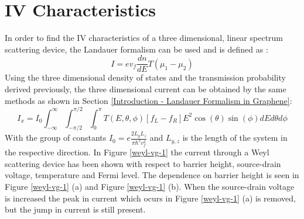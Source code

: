 		\section{IV Characteristics}
		\label{weyl - IV Characteristics}
		In order to find the IV characteristics of a three dimensional, linear spectrum scattering device, the Landauer formalism can be used and is defined as \cite{b6}:
		\begin{equation}
			I=ev_{f}\frac{dn}{dE}T\left(\mu_{1}-\mu_{2}\right)
		\end{equation}
		Using the three dimensional density of states and the transmission probability derived previously, the three dimensional current can be obtained by the same methods as shown in Section \ref{Introduction - Landauer Formalism in Graphene}:
		\begin{equation}
			I_{x}=I_{0}\int^{\infty}_{-\infty}\int^{\pi/2}_{-\pi/2}\int^{\pi}_{0}T\left(E,\theta, \phi\right)\left[f_{L}-f_{R}\right]E^{2}\cos(\theta)\sin(\phi)dEd\theta d\phi
			\label{weyl-i}
		\end{equation}
		With the group of constants $I_{0}=e\frac{2L_{y}L_{z}}{\pi\hbar^{3}v_{f}^{2}}$ and $L_{y,z}$ is the length of the system in the respective direction. In Figure \ref{weyl-vg-1} the current through a Weyl scattering device has been shown with respect to barrier height, source-drain voltage, temperature and Fermi level. The dependence on barrier height is seen in Figure \ref{weyl-vg-1} (a) and Figure \ref{weyl-vg-1} (b). When the source-drain voltage is increased the peak in current which ocurs in Figure \ref{weyl-vg-1} (a) is removed, but the jump in current is still present. 
